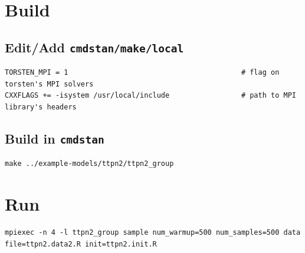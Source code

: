 \documentclass[11pt]{article}
\begin{document}
\section{Build}
\label{sec:org106765f}
\subsection{Edit/Add \texttt{cmdstan/make/local}}
\label{sec:org4e4edb6}
\begin{verbatim}
TORSTEN_MPI = 1                                         # flag on torsten's MPI solvers
CXXFLAGS += -isystem /usr/local/include                 # path to MPI library's headers
\end{verbatim}
\subsection{Build in \texttt{cmdstan}}
\label{sec:org6d5eec1}
\begin{verbatim}
make ../example-models/ttpn2/ttpn2_group
\end{verbatim}
\section{Run}
\label{sec:org99d9e2b}
\begin{verbatim}
mpiexec -n 4 -l ttpn2_group sample num_warmup=500 num_samples=500 data file=ttpn2.data2.R init=ttpn2.init.R
\end{verbatim}




\end{document}
